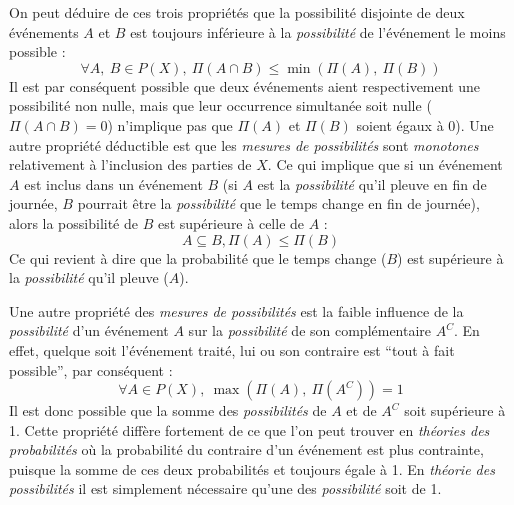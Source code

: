 On peut déduire de ces trois propriétés \autocite{Bouchon-Meunier2007}
que la possibilité disjointe de deux événements \(A\) et \(B\) est
toujours inférieure à la \emph{possibilité} de l'événement le moins
possible :
%
\begin{equation}
  ∀ A,\ B ∈ P(X),\ Π(A ∩ B) ≤ \min(Π(A),\ Π(B))
\end{equation}
%
Il est par conséquent possible que deux événements aient
respectivement une possibilité non nulle, mais que leur occurrence
simultanée soit nulle (\( Π(A ∩ B) = 0\)) n'implique pas que \(Π(A)\)
et \(Π(B)\) soient égaux à 0). Une autre propriété déductible est que
les \emph{mesures de possibilités} sont \emph{monotones} relativement
à l'inclusion des parties de \(X\). Ce qui implique que si un
événement \(A\) est inclus dans un événement \(B\) (\eg si \(A\) est
la \emph{possibilité} qu'il pleuve en fin de journée, \(B\) pourrait
être la \emph{possibilité} que le temps change en fin de journée),
alors la possibilité de \(B\) est supérieure à celle de \(A\) :
%
\begin{equation}
  A \subseteq B, Π(A) ≤ Π(B)
\end{equation}
%
Ce qui revient à dire que la probabilité que le temps change (\(B\))
est supérieure à la \emph{possibilité} qu'il pleuve (\(A\)).

Une autre propriété des \emph{mesures de possibilités} est la faible
influence de la \emph{possibilité} d'un événement \(A\) sur la
\emph{possibilité} de son complémentaire \(A^C\). En effet, quelque
soit l’événement traité, lui ou son contraire est \enquote{tout à fait
  possible}, par conséquent :
%
\begin{equation}
  ∀ A ∈ P(X),\ \max(Π(A),\ Π(A^C)) = 1  
\end{equation}
%
Il est donc possible que la somme des \emph{possibilités} de \(A\) et
de \(A^C\) soit supérieure à 1. Cette propriété diffère fortement de
ce que l'on peut trouver en \emph{théories des probabilités} où la
probabilité du contraire d'un événement est plus contrainte, puisque
la somme de ces deux probabilités et toujours égale à 1. En
\emph{théorie des possibilités} il est simplement nécessaire qu'une
des \emph{possibilité} soit de 1.

